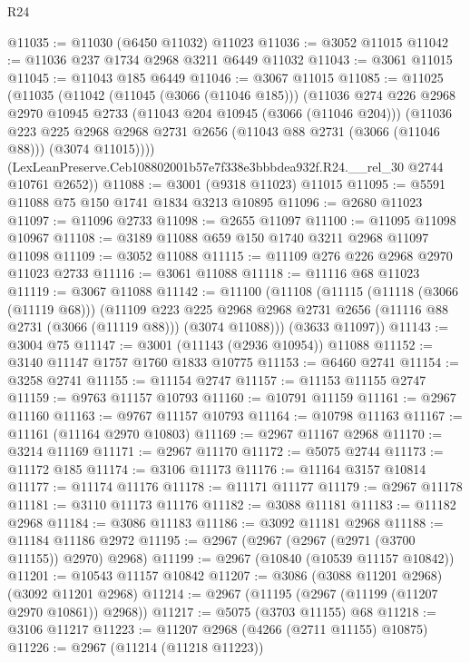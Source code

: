 \begin{lexlean}{R24}
\begin{coremodule}
@11035 := @11030 (@6450 @11032) @11023
@11036 := @3052 @11015
@11042 := @11036 @237 @1734 @2968 @3211 @6449 @11032
@11043 := @3061 @11015
@11045 := @11043 @185 @6449
@11046 := @3067 @11015
@11085 := @11025
    (@11035
      (@11042
        (@11045 (@3066 (@11046 @185)))
        (@11036
          @274
          @226
          @2968
          @2970
          @10945
          @2733
          (@11043 @204 @10945 (@3066 (@11046 @204)))
          (@11036
            @223
            @225
            @2968
            @2968
            @2731
            @2656
            (@11043 @88 @2731 (@3066 (@11046 @88)))
            (@3074 @11015))))
      (LexLeanPreserve.Ceb108802001b57e7f338e3bbbdea932f.R24.__rel_30 @2744 @10761 @2652))
@11088 := @3001 (@9318 @11023) @11015
@11095 := @5591 @11088 @75 @150 @1741 @1834 @3213 @10895
@11096 := @2680 @11023
@11097 := @11096 @2733
@11098 := @2655 @11097
@11100 := @11095 @11098 @10967
@11108 := @3189 @11088 @659 @150 @1740 @3211 @2968 @11097 @11098
@11109 := @3052 @11088
@11115 := @11109 @276 @226 @2968 @2970 @11023 @2733
@11116 := @3061 @11088
@11118 := @11116 @68 @11023
@11119 := @3067 @11088
@11142 := @11100
    (@11108
      (@11115
        (@11118 (@3066 (@11119 @68)))
        (@11109
          @223
          @225
          @2968
          @2968
          @2731
          @2656
          (@11116 @88 @2731 (@3066 (@11119 @88)))
          (@3074 @11088)))
      (@3633 @11097))
@11143 := @3004 @75
@11147 := @3001 (@11143 (@2936 @10954)) @11088
@11152 := @3140 @11147 @1757 @1760 @1833 @10775
@11153 := @6460 @2741
@11154 := @3258 @2741
@11155 := @11154 @2747
@11157 := @11153 @11155 @2747
@11159 := @9763 @11157 @10793
@11160 := @10791 @11159
@11161 := @2967 @11160
@11163 := @9767 @11157 @10793
@11164 := @10798 @11163
@11167 := @11161 (@11164 @2970 @10803)
@11169 := @2967 @11167 @2968
@11170 := @3214 @11169
@11171 := @2967 @11170
@11172 := @5075 @2744
@11173 := @11172 @185
@11174 := @3106 @11173
@11176 := @11164 @3157 @10814
@11177 := @11174 @11176
@11178 := @11171 @11177
@11179 := @2967 @11178
@11181 := @3110 @11173 @11176
@11182 := @3088 @11181
@11183 := @11182 @2968
@11184 := @3086 @11183
@11186 := @3092 @11181 @2968
@11188 := @11184 @11186 @2972
@11195 := @2967 (@2967 (@2967 (@2971 (@3700 @11155)) @2970) @2968)
@11199 := @2967 (@10840 (@10539 @11157 @10842))
@11201 := @10543 @11157 @10842
@11207 := @3086 (@3088 @11201 @2968) (@3092 @11201 @2968)
@11214 := @2967 (@11195 (@2967 (@11199 (@11207 @2970 @10861)) @2968))
@11217 := @5075 (@3703 @11155) @68
@11218 := @3106 @11217
@11223 := @11207 @2968 (@4266 (@2711 @11155) @10875)
@11226 := @2967 (@11214 (@11218 @11223))

\end{coremodule}
\end{lexlean}
